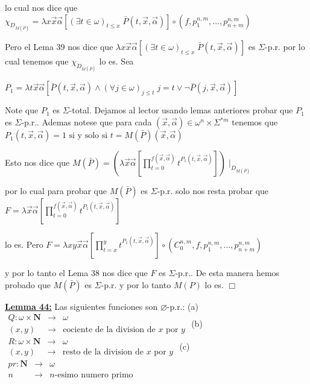 lo cual nos dice que
\(\displaystyle \chi _{D_{M(\bar{P})}}=\lambda x\vec{x}\vec{\alpha}\left[ (\exists t\in \omega )_{t\leq x}\;\bar{P}(t,\vec{x},\vec{\alpha})\right] \circ (f,p_{1}^{n,m},...,p_{n+m}^{n,m}) \)

Pero el Lema 39 nos dice que \(\lambda x\vec{x}\vec{\alpha} \left[ (\exists t\in \omega )_{t\leq x}\;\bar{P}(t,\vec{x},\vec{\alpha}) \right] \) es \(\Sigma \)-p.r. por lo cual tenemos que \(\chi _{D_{M(\bar{P})}}\) lo es.
Sea

\(\displaystyle P_{1}=\lambda t\vec{x}\vec{\alpha}\left[ \bar{P}(t,\vec{x},\vec{\alpha} )\wedge (\forall j\in \omega )_{j\leq t}\;j=t\vee \lnot \bar{P}(j,\vec{x}, \vec{\alpha})\right] \)

Note que \(P_{1}\) es \(\Sigma \)-total. Dejamos al lector usando lemas anteriores probar que \(P_{1}\) es \(\Sigma \)-p.r.. Ademas notese que para cada \((\vec{x},\vec{\alpha})\in \omega ^{n}\times \Sigma ^{\ast m}\) tenemos que
\(\displaystyle P_{1}(t,\vec{x},\vec{\alpha})=1\text{ si y solo si }t=M(\bar{P})(\vec{x}, \vec{\alpha}) \)

Esto nos dice que
\(\displaystyle M(\bar{P})=\left( \lambda \vec{x}\vec{\alpha}\left[ \prod_{t=0}^{f(\vec{x}, \vec{\alpha})}t^{P_{1}(t,\vec{x},\vec{\alpha})}\right] \right) \mid _{D_{M( \bar{P})}} \)

por lo cual para probar que \(M(\bar{P})\) es \(\Sigma \)-p.r. solo nos resta probar que
\(\displaystyle F=\lambda \vec{x}\vec{\alpha}\left[ \prod_{t=0}^{f(\vec{x},\vec{\alpha} )}t^{P_{1}(t,\vec{x},\vec{\alpha})}\right] \)

lo es. Pero
\(\displaystyle F=\lambda xy\vec{x}\vec{\alpha}\left[ \prod_{t=x}^{y}t^{P_{1}(t,\vec{x},\vec{ \alpha})}\right] \circ (C_{0}^{n,m},f,p_{1}^{n,m},...,p_{n+m}^{n,m}) \)

y por lo tanto el Lema 38 nos dice que \(F\) es \(\Sigma \)-p.r.. De esta manera hemos probado que \(M(\bar{P})\) es \(\Sigma \)-p.r. y por lo tanto \(M(P)\) lo es. \(\Box\)

\textbf{\underline{Lemma 44:}} Las siguientes funciones son \(\varnothing \)-p.r.:
(a) \( \begin{array}{rll} Q:\omega \times \mathbf{N} & \rightarrow & \omega \\ (x,y) & \rightarrow & \text{cociente de la division de }x\text{ por }y \end{array} \)
(b) \( \begin{array}{rll} R:\omega \times \mathbf{N} & \rightarrow & \omega \\ (x,y) & \rightarrow & \text{resto de la division de }x\text{ por }y \end{array} \)
(c) \( \begin{array}{rll} pr:\mathbf{N} & \rightarrow & \omega \\ n & \rightarrow & n\text{-esimo numero primo} \end{array} \)


